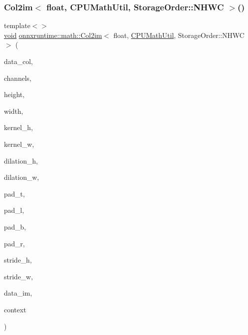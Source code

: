 \mbox{\label{namespaceonnxruntime_1_1math_a56961fa111a24e283dad2df286c006c7}} 
\subsubsection{\texorpdfstring{Col2im$<$ float, C\+P\+U\+Math\+Util, Storage\+Order\+::\+N\+H\+W\+C $>$()}{Col2im< float, CPUMathUtil, StorageOrder::NHWC >()}}
{\footnotesize\ttfamily template$<$$>$ \\
\mbox{\hyperlink{mlasi_8h_a88f941d423cb2a819b70a1358982b1a6}{void}} \mbox{\hyperlink{namespaceonnxruntime_1_1math_a2146d8b8e4933d93cb0934db0ed984a1}{onnxruntime\+::math\+::\+Col2im}}$<$ float, \mbox{\hyperlink{classonnxruntime_1_1CPUMathUtil}{C\+P\+U\+Math\+Util}}, Storage\+Order\+::\+N\+H\+WC $>$ (\begin{DoxyParamCaption}\item[{const float $\ast$}]{data\+\_\+col,  }\item[{const int64\+\_\+t}]{channels,  }\item[{const int64\+\_\+t}]{height,  }\item[{const int64\+\_\+t}]{width,  }\item[{const int64\+\_\+t}]{kernel\+\_\+h,  }\item[{const int64\+\_\+t}]{kernel\+\_\+w,  }\item[{const int64\+\_\+t}]{dilation\+\_\+h,  }\item[{const int64\+\_\+t}]{dilation\+\_\+w,  }\item[{const int64\+\_\+t}]{pad\+\_\+t,  }\item[{const int64\+\_\+t}]{pad\+\_\+l,  }\item[{const int64\+\_\+t}]{pad\+\_\+b,  }\item[{const int64\+\_\+t}]{pad\+\_\+r,  }\item[{const int64\+\_\+t}]{stride\+\_\+h,  }\item[{const int64\+\_\+t}]{stride\+\_\+w,  }\item[{float $\ast$}]{data\+\_\+im,  }\item[{\mbox{\hyperlink{classonnxruntime_1_1CPUMathUtil}{C\+P\+U\+Math\+Util}} $\ast$}]{context }\end{DoxyParamCaption})}

